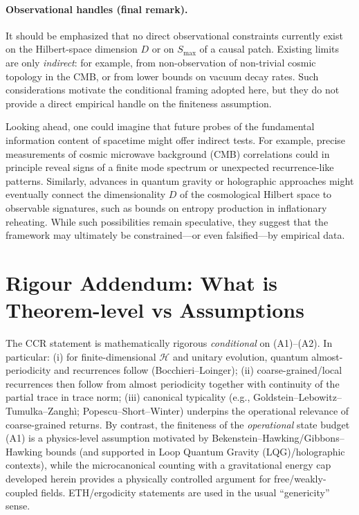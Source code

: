 \documentclass[12pt]{article}
\theoremstyle{remark}
\begin{document}
\paragraph{Observational handles (final remark).}
It should be emphasized that no direct observational constraints currently exist on the
Hilbert-space dimension $D$ or on $S_{\max}$ of a causal patch. Existing limits are only
\emph{indirect}: for example, from non-observation of non-trivial cosmic topology in the CMB,
or from lower bounds on vacuum decay rates. Such considerations motivate the conditional
framing adopted here, but they do not provide a direct empirical handle on the finiteness
assumption. 

Looking ahead, one could imagine that future probes of the fundamental 
information content of spacetime might offer indirect tests. For example, 
precise measurements of cosmic microwave background (CMB) correlations 
could in principle reveal signs of a finite mode spectrum or unexpected 
recurrence-like patterns. Similarly, advances in quantum gravity or 
holographic approaches might eventually connect the dimensionality $D$ of 
the cosmological Hilbert space to observable signatures, such as bounds 
on entropy production in inflationary reheating. While such possibilities 
remain speculative, they suggest that the framework may ultimately be 
constrained—or even falsified—by empirical data.


\section{Rigour Addendum: What is Theorem-level vs Assumptions}\label{sec:rigour-addendum}
The CCR statement is mathematically rigorous \emph{conditional} on (A1)--(A2). In particular:
(i) for finite-dimensional $\mathcal H$ and unitary evolution, quantum almost-periodicity and recurrences follow (Bocchieri--Loinger);
(ii) coarse-grained/local recurrences then follow from almost periodicity together with continuity of the partial trace in trace norm;
(iii) canonical typicality (e.g., Goldstein--Lebowitz--Tumulka--Zangh\`i; Popescu--Short--Winter) underpins the operational relevance of coarse-grained returns.
By contrast, the finiteness of the \emph{operational} state budget (A1) is a physics-level assumption motivated by Bekenstein--Hawking/Gibbons--Hawking bounds (and supported in Loop Quantum Gravity (LQG)/holographic contexts), while the microcanonical counting with a gravitational energy cap developed herein provides a physically controlled argument for free/weakly-coupled fields. ETH/ergodicity statements are used in the usual ``genericity'' sense.
\end{document}
